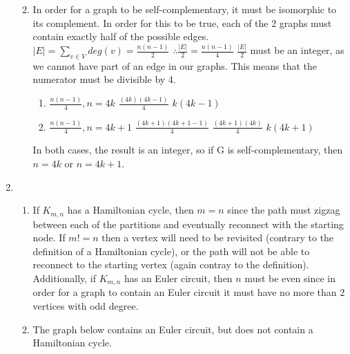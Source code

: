 \documentclass{article}
\begin{document}
\begin{enumerate}
\begin{enumerate}
			\newpage
			\item In order for a graph to be self-complementary, it must be isomorphic to its complement. In order for this to be true, each of the 2 graphs must contain exactly half of the possible edges.
			\newline $|E| = \sum\limits_{v\in V}deg(v)= \frac{n(n-1)}{2}$
			\newline $\therefore \frac{|E|}{2}=\frac{n(n-1)}{4}$
			\newline $\frac{|E|}{2}$ must be an integer, as we cannot have part of an edge in our graphs. This means that the numerator must be divisible by 4.
			\begin{enumerate}
				\item $\frac{n(n-1)}{4}, n=4k$
				\newline $\frac{(4k)(4k-1)}{4}$
				\newline $k(4k-1)$
				
				\item $\frac{n(n-1)}{4}, n=4k+1$
				\newline $\frac{(4k+1)(4k+1-1)}{4}$
				\newline $\frac{(4k+1)(4k)}{4}$
				\newline $k(4k+1)$
			\end{enumerate}
			In both cases, the result is an integer, so if G is self-complementary, then $n=4k$ or $n=4k+1$.
		\end{enumerate}
		
		\item
		\begin{enumerate}
			\item If $K_{m,n}$ has a Hamiltonian cycle, then $m=n$ since the path must zigzag between each of the partitions and eventually reconnect with the starting node. If $m!=n$ then a vertex will need to be revisited (contrary to the definition of a Hamiltonian cycle), or the path will not be able to reconnect to the starting vertex (again contray to the definition).
			\newline Additionally, if $K_{m,n}$ has an Euler circuit, then $n$ must be even since in order for a graph to contain an Euler circuit it must have no more than 2 vertices with odd degree.
			
			\item The graph below contains an Euler circuit, but does not contain a Hamiltonian cycle.
			\newline
			\begin{center}
\end{center}
\end{enumerate}
\end{enumerate}
\end{document}
